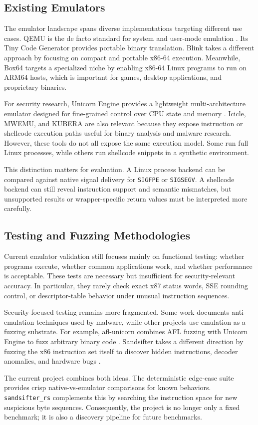
\subsection{Existing Emulators}

The emulator landscape spans diverse implementations targeting different use cases. QEMU is the de facto standard for system and user-mode emulation \cite{bellard2005qemu}. Its Tiny Code Generator provides portable binary translation. Blink takes a different approach by focusing on compact and portable x86-64 execution. Meanwhile, Box64 targets a specialized niche by enabling x86-64 Linux programs to run on ARM64 hosts, which is important for games, desktop applications, and proprietary binaries.

For security research, Unicorn Engine provides a lightweight multi-architecture emulator designed for fine-grained control over CPU state and memory \cite{unicorn2015}. Icicle, MWEMU, and KUBERA are also relevant because they expose instruction or shellcode execution paths useful for binary analysis and malware research. However, these tools do not all expose the same execution model. Some run full Linux processes, while others run shellcode snippets in a synthetic environment.

This distinction matters for evaluation. A Linux process backend can be compared against native signal delivery for \texttt{SIGFPE} or \texttt{SIGSEGV}. A shellcode backend can still reveal instruction support and semantic mismatches, but unsupported results or wrapper-specific return values must be interpreted more carefully.

\subsection{Testing and Fuzzing Methodologies}

Current emulator validation still focuses mainly on functional testing: whether programs execute, whether common applications work, and whether performance is acceptable. These tests are necessary but insufficient for security-relevant accuracy. In particular, they rarely check exact x87 status words, SSE rounding control, or descriptor-table behavior under unusual instruction sequences.

Security-focused testing remains more fragmented. Some work documents anti-emulation techniques used by malware, while other projects use emulation as a fuzzing substrate. For example, afl-unicorn combines AFL fuzzing with Unicorn Engine to fuzz arbitrary binary code \cite{aflunicorn2017}. Sandsifter takes a different direction by fuzzing the x86 instruction set itself to discover hidden instructions, decoder anomalies, and hardware bugs \cite{domas2017sandsifter}.

The current project combines both ideas. The deterministic edge-case suite provides crisp native-vs-emulator comparisons for known behaviors. \texttt{sandsifter\_rs} complements this by searching the instruction space for new suspicious byte sequences. Consequently, the project is no longer only a fixed benchmark; it is also a discovery pipeline for future benchmarks.
